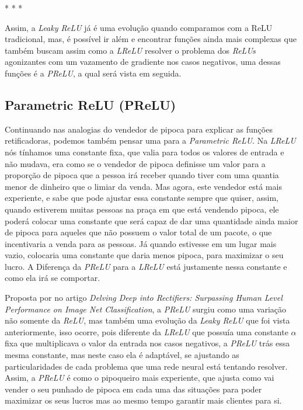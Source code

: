 \medskip
\begin{center}
 * * *
\end{center}
\medskip

Assim, a \textit{Leaky ReLU} já é uma evolução quando comparamos com a ReLU tradicional, mas, é possível ir além e encontrar funções ainda mais complexas que também buscam assim como a \textit{LReLU} resolver o problema dos \textit{ReLUs} agonizantes com um vazamento de gradiente nos casos negativos, uma dessas funções é a \textit{PReLU}, a qual será vista em seguida.

\subsection{Parametric ReLU (PReLU)}

Continuando nas analogias do vendedor de pipoca para explicar as funções retificadoras, podemos também pensar uma para a \textit{Parametric ReLU}. Na \textit{LReLU} nós tínhamos uma constante fixa, que valia para todos os valores de entrada e não mudava, era como se o vendedor de pipoca definisse um valor para a proporção de pipoca que a pessoa irá receber quando tiver com uma quantia menor de dinheiro que o limiar da venda. Mas agora, este vendedor está mais experiente, e sabe que pode ajustar essa constante sempre que quiser, assim, quando estiverem muitas pessoas na praça em que está vendendo pipoca, ele poderá colocar uma constante que será capaz de dar uma quantidade ainda maior de pipoca para aqueles que não possuem o valor total de um pacote, o que incentivaria a venda para as pessoas. Já quando estivesse em um lugar mais vazio, colocaria uma constante que daria menos pipoca, para maximizar o seu lucro. A Diferença da \textit{PReLU} para a \textit{LReLU} está justamente nessa constante e como ela irá se comportar.

Proposta por \textcite{PReLUArticle} no artigo \textit{Delving Deep into Rectifiers: Surpassing Human Level Performance on Image Net Classification}, a \textit{PReLU} surgiu como uma variação não somente da \textit{ReLU}, mas também uma evolução da \textit{Leaky ReLU} que foi vista anteriormente, isso ocorre, pois diferente da \textit{LReLU} que possuía uma constante $\alpha$ fixa que multiplicava o valor da entrada nos casos negativos, a \textit{PReLU} trás essa mesma constante, mas neste caso ela é adaptável, se ajustando as particularidades de cada problema que uma rede neural está tentando resolver. Assim, a \textit{PReLU} é como o pipoqueiro mais experiente, que ajusta como vai vender o seu punhado de pipoca em cada uma das situações para poder maximizar os seus lucros mas ao mesmo tempo garantir mais clientes para si.

